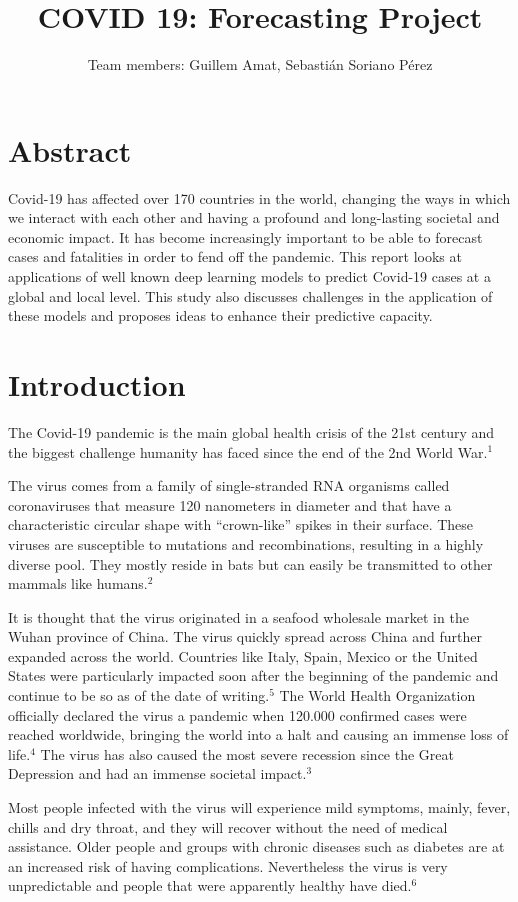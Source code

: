 \documentclass{article}
\title{COVID 19: Forecasting Project}
\author{
  Team members: Guillem Amat, Sebastián Soriano Pérez
}
\begin{document}
\maketitle
\section*{Abstract}
Covid-19 has affected over 170 countries in the world, changing the ways in which we interact with each other and having a profound and long-lasting societal and economic impact. It has become increasingly important to be able to forecast cases and fatalities in order to fend off the pandemic. This report looks at applications of well known deep learning models to predict Covid-19 cases at a global and local level. This study also discusses challenges in the application of these models and proposes ideas to enhance their predictive capacity.

\section{Introduction}
The Covid-19 pandemic is the main global health crisis of the 21st century and the biggest challenge humanity has faced since the end of the 2nd World War.$^{1}$

The virus comes from a family of single-stranded RNA organisms called coronaviruses that measure 120 nanometers in diameter and that have a characteristic circular shape with “crown-like” spikes in their surface. These viruses are susceptible to mutations and recombinations, resulting in a highly diverse pool. They mostly reside in bats but can easily be transmitted to other mammals like humans.$^{2}$

It is thought that the virus originated in a seafood wholesale market in the Wuhan province of China. The virus quickly spread across China and further expanded across the world. Countries like Italy, Spain, Mexico or the United States were particularly impacted soon after the beginning of the pandemic and continue to be so as of the date of writing.$^{5}$ The World Health Organization officially declared the virus a pandemic when 120.000 confirmed cases were reached worldwide, bringing the world into a halt and causing an immense loss of life.$^{4}$ The virus has also caused the most severe recession since the Great Depression and had an immense societal impact.$^{3}$

Most people infected with the virus will experience mild symptoms, mainly, fever, chills and dry throat, and they will recover without the need of medical assistance. Older people and groups with chronic diseases such as diabetes are at an increased risk of having complications. Nevertheless the virus is very unpredictable and people that were apparently healthy have died.$^{6}$
\end{document}
